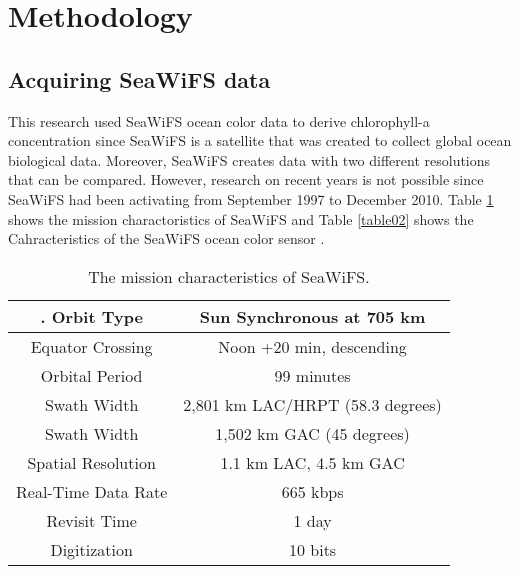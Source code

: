 \section{Methodology}

\subsection{Acquiring SeaWiFS data}

 This research used SeaWiFS ocean color data to derive chlorophyll-a concentration since SeaWiFS is a satellite that was created to collect global ocean biological data. Moreover, SeaWiFS creates data with two different resolutions that can be compared. However, research on recent years is not possible since SeaWiFS had been activating from September 1997 to December 2010. Table \ref{table01} shows the mission charactoristics of SeaWiFS and Table \ref{table02} shows the Cahracteristics of the SeaWiFS ocean color sensor \cite{hooker1992An}.

 \begin{table}[h]\textwidth
 	\caption{The mission characteristics of SeaWiFS.}
 	\label{table01}
 	\centering
 	\begin{tabular}{c|c}
 		\hline \setlength{\arrayrulewidth}{0.8pt}. 
 	Orbit Type	& Sun Synchronous at 705 km \\ \hline
 	Equator Crossing &	Noon +20 min, descending \\ \hline
 	Orbital Period &	99 minutes  \\ \hline
 	Swath Width &	2,801 km LAC/HRPT (58.3 degrees)  \\ \hline
 	Swath Width &	1,502 km GAC (45 degrees)  \\ \hline
 	Spatial Resolution &	1.1 km LAC, 4.5 km GAC  \\ \hline
 	Real-Time Data Rate &	665 kbps  \\ \hline
 	Revisit Time &	1 day  \\ \hline
 	Digitization &	10 bits  \\ \hline
 	\end{tabular}
 \end{table}

